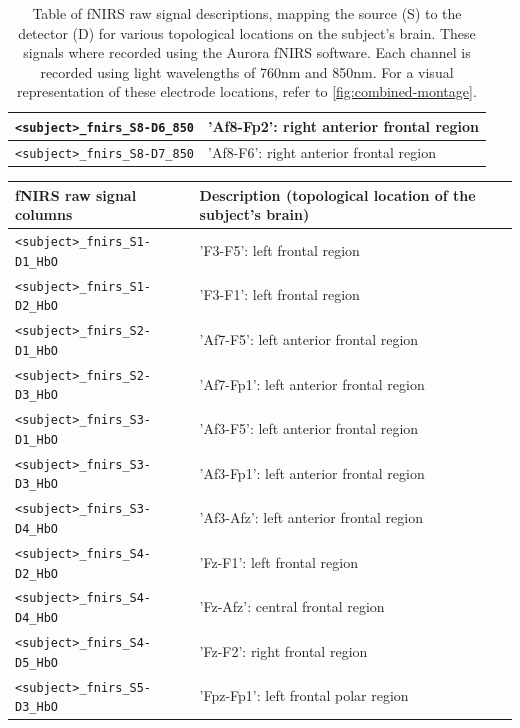 \begin{table}
\begin{tabularx}{\textwidth}{|l|X|}
  \hline
  \texttt{<subject>\_fnirs\_S8-D6\_850} & 'Af8-Fp2': right anterior frontal region  \\
  \hline
  \texttt{<subject>\_fnirs\_S8-D7\_850} & 'Af8-F6': right anterior frontal region  \\
  \hline
  \end{tabularx}
  \caption{Table of fNIRS raw signal descriptions, mapping the source (S) to the detector (D) for various topological locations on the subject's brain. These signals where recorded using the Aurora fNIRS software. Each channel is recorded using light wavelengths of 760nm and 850nm. For a visual representation of these electrode locations, refer to \autoref{fig:combined-montage}.}
  \label{tab:fNIRS_raw_signals}
  \end{table}

  \begin{table}
    \centering
    \begin{tabularx}{\textwidth}{|l|X|}
    \hline
    \textbf{fNIRS raw signal columns} & \textbf{Description (topological location of the subject's brain)} \\
    \hline
    \texttt{<subject>\_fnirs\_S1-D1\_HbO} & 'F3-F5': left frontal region \\
    \hline
    \texttt{<subject>\_fnirs\_S1-D2\_HbO} & 'F3-F1': left frontal region  \\
    \hline
    \texttt{<subject>\_fnirs\_S2-D1\_HbO} & 'Af7-F5': left anterior frontal region  \\
    \hline
    \texttt{<subject>\_fnirs\_S2-D3\_HbO} & 'Af7-Fp1': left anterior frontal region  \\
    \hline
    \texttt{<subject>\_fnirs\_S3-D1\_HbO} & 'Af3-F5': left anterior frontal region  \\
    \hline
    \texttt{<subject>\_fnirs\_S3-D3\_HbO} & 'Af3-Fp1': left anterior frontal region  \\
    \hline
    \texttt{<subject>\_fnirs\_S3-D4\_HbO} & 'Af3-Afz': left anterior frontal region  \\
    \hline
    \texttt{<subject>\_fnirs\_S4-D2\_HbO} & 'Fz-F1': left frontal region  \\
    \hline
    \texttt{<subject>\_fnirs\_S4-D4\_HbO} & 'Fz-Afz': central frontal region  \\
    \hline
    \texttt{<subject>\_fnirs\_S4-D5\_HbO} & 'Fz-F2': right frontal region  \\
    \hline
    \texttt{<subject>\_fnirs\_S5-D3\_HbO} & 'Fpz-Fp1': left frontal polar region  \\

\end{tabularx}
\end{table}
